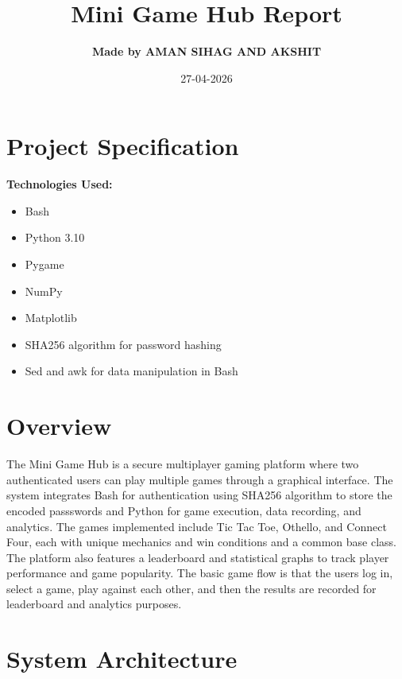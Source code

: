 \documentclass[12pt]{article} %
\title{\textbf{Mini Game Hub Report}}       %
\author{\textbf{Made by AMAN SIHAG AND AKSHIT}}
\date{27-04-2026}
\begin{document}
\maketitle %
\thispagestyle{empty} %
\clearpage %

\tableofcontents  %
\thispagestyle{empty}   %
\clearpage

\section{Project Specification}  %

\textbf{Technologies Used:}
\begin{itemize}
    \item Bash
    \item Python 3.10
    \item Pygame
    \item NumPy
    \item Matplotlib
    \item SHA256 algorithm for password hashing
    \item Sed and awk for data manipulation in Bash

\end{itemize}

\section{Overview}

The Mini Game Hub is a secure multiplayer gaming platform where two authenticated users can play multiple games through a graphical interface. The system integrates Bash for authentication using SHA256 algorithm to store the encoded passswords and Python for game execution, data recording, and analytics. 
The games implemented include Tic Tac Toe, Othello, and Connect Four, each with unique mechanics and win conditions and a common base class. The platform also features a leaderboard and statistical graphs to track player performance and game popularity.
The basic game flow is that the users log in, select a game, play against each other, and then the results are recorded for leaderboard and analytics purposes.


\section{System Architecture}  
\end{document}
